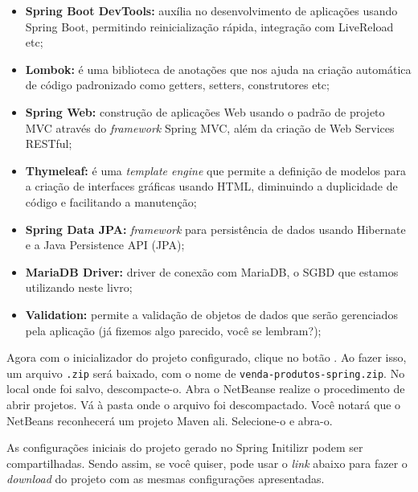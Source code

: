\begin{itemize}

    \item \textbf{Spring Boot DevTools:} auxília no desenvolvimento de aplicações usando Spring Boot, permitindo reinicialização rápida, integração com LiveReload etc;
    
    \item \textbf{Lombok:} é uma biblioteca de anotações que nos ajuda na criação automática de código padronizado como getters, setters, construtores etc;
    
    \item \textbf{Spring Web:} construção de aplicações Web usando o padrão de projeto MVC através do \textit{framework} Spring MVC, além da criação de Web Services RESTful;
    
    \item \textbf{Thymeleaf:} é uma \textit{template engine} que permite a definição de modelos para a criação de interfaces gráficas usando HTML, diminuindo a duplicidade de código e facilitando a manutenção;
    
    \item \textbf{Spring Data JPA:} \textit{framework} para persistência de dados usando Hibernate e a Java Persistence API (JPA);
    
    \item \textbf{MariaDB Driver:} driver de conexão com MariaDB, o SGBD que estamos utilizando neste livro;
    
    \item \textbf{Validation:} permite a validação de objetos de dados que serão gerenciados pela aplicação (já fizemos algo parecido, você se lembram?);
    
\end{itemize}

Agora com o inicializador do projeto configurado, clique no botão . Ao fazer isso, um arquivo \texttt{.zip} será baixado, com o nome de \texttt{venda-produtos-spring.zip}. No local onde foi salvo, descompacte-o. Abra o NetBeanse realize o procedimento de abrir projetos. Vá à pasta onde o arquivo foi descompactado. Você notará que o NetBeans reconhecerá um projeto Maven ali. Selecione-o e abra-o.

As configurações iniciais do projeto gerado no Spring Initilizr podem ser compartilhadas. Sendo assim, se você quiser, pode usar o \textit{link} abaixo para fazer o \textit{download} do projeto com as mesmas configurações apresentadas.

